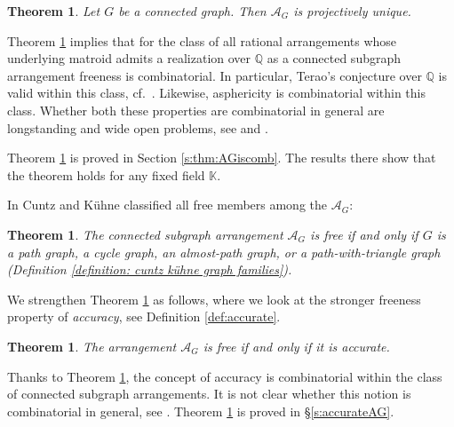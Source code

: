 \documentclass[12pt]{amsart}
\newcommand\CA{{\mathscr A}}
\newcommand\BBK{{\mathbb K}}
\newcommand\BBQ{{\mathbb Q}}
\numberwithin{equation}{section}
\theoremstyle{plain}
\newtheorem{theorem}[equation]{Theorem}
\theoremstyle{definition}
\begin{document}
\begin{theorem}
	\label{thm:AGiscomb}
	Let $G$ be a connected graph. Then $\CA_G$ is projectively unique. 
\end{theorem}

Theorem \ref{thm:AGiscomb} implies that 
for the class of all rational arrangements whose underlying matroid admits a realization over $\BBQ$ as a connected subgraph arrangement 
freeness is combinatorial. In particular, Terao's conjecture over $\BBQ$ is valid within this class, cf.~\cite[Prop.~2.3]{ziegler:matroid}. Likewise, asphericity is combinatorial within this class. Whether both these properties are combinatorial in general are longstanding and wide open problems, see  \cite[Conj.~4.138]{orlikterao:arrangements} and \cite[Prob.~3.8]{falkrandell:homotopyII}.

Theorem \ref{thm:AGiscomb} is proved  in Section \ref{s:thm:AGiscomb}.  The results there show that the theorem holds for any fixed field $\BBK$.

In \cite[Thm.~1.6]{cuntzkuehne:subgraphs} Cuntz and K\"uhne classified all free members among the $\CA_G$:

\begin{theorem}
	\label{thm:freeAG}
	The connected subgraph arrangement $\CA_G$ is free if and only if $G$ is a path graph, a cycle graph, an almost-path graph, or a path-with-triangle graph (Definition \ref{definition: cuntz kühne graph families}).
\end{theorem}

We strengthen Theorem \ref{thm:freeAG} as follows, where we look at the stronger freeness property of \emph{accuracy}, see Definition \ref{def:accurate}.

\begin{theorem}
	\label{thm:accurateAG}
	The arrangement $\CA_G$ is free if and only if it is accurate.
\end{theorem}

Thanks to Theorem \ref{thm:AGiscomb}, the concept of accuracy is combinatorial within the class of connected subgraph arrangements. It is not clear whether this notion is combinatorial in general, see \cite[Rem.~1.3(ii)]{mueckschroehrletran:flagaccurate}.
Theorem \ref{thm:accurateAG}
is proved in \S \ref{s:accurateAG}.
\end{document}
